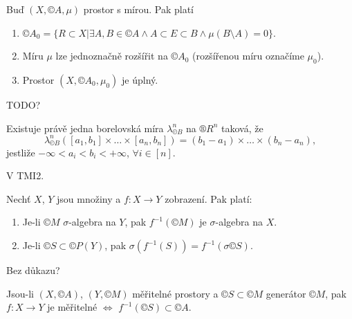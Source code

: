 \documentclass[12pt]{article}					%
\begin{document}
\begin{veta}
	Buď $(X, ©A, \mu)$ prostor s mírou. Pak platí
	
	\begin{enumerate}
		\item $©A_0 = \{R \subset X | \exists A, B \in ©A \land A \subset E \subset B \land \mu(B \setminus A) = 0\}$.
		\item Míru $\mu$ lze jednoznačně rozšířit na $©A_0$ (rozšířenou míru označíme $\mu_0$).
		\item Prostor $(X, ©A_0, \mu_0)$ je úplný.
	\end{enumerate}

	\begin{dukazin}
		TODO?
	\end{dukazin}
\end{veta}

\begin{veta}
	Existuje právě jedna borelovská míra $\lambda_{©B}^n$ na $®R^n$ taková, že
	$$ \lambda_{©B}^n([a_1, b_1] \times … \times [a_n, b_n]) = (b_1 - a_1) \times … \times (b_n - a_n), $$
	jestliže $-∞ < a_i < b_i < + ∞$, $\forall i \in [n]$.

	\begin{dukazin}
		V TMI2.
	\end{dukazin}
\end{veta}


\begin{veta}
	Nechť $X$, $Y$ jsou množiny a $f: X \rightarrow Y$ zobrazení. Pak platí:

	\begin{enumerate}
		\item Je-li $©M$ $\sigma$-algebra na $Y$, pak $f^{-1}(©M)$ je $\sigma$-algebra na $X$.
		\item Je-li $©S \subset ©P(Y)$, pak $\sigma(f^{-1}(S)) = f^{-1}(\sigma ©S)$.
	\end{enumerate}

	\begin{dukazin}
		Bez důkazu?
	\end{dukazin}
\end{veta}

\begin{dusledek}
	Jsou-li $(X, ©A)$, $(Y, ©M)$ měřitelné prostory a $©S \subset ©M$ generátor $©M$, pak $f: X \rightarrow Y$ je měřitelné $\Leftrightarrow$ $f^{-1}(©S) \subset ©A$.
\end{dusledek}
\end{document}
